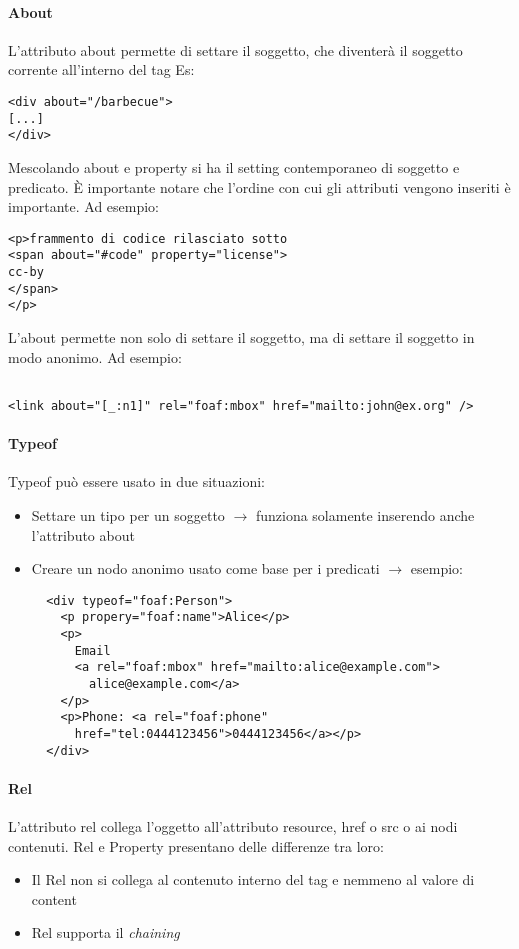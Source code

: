\paragraph*{About}L'attributo about permette di settare il soggetto, che diventer\`a il soggetto corrente all'interno del tag
Es:
\begin{verbatim}
<div about="/barbecue">
[...]
</div>
\end{verbatim}

Mescolando about e property si ha il setting contemporaneo di soggetto e predicato. \`E importante notare che l'ordine con cui gli attributi vengono inseriti \`e importante. Ad esempio:
\begin{verbatim}
<p>frammento di codice rilasciato sotto
<span about="#code" property="license">
cc-by
</span>
</p>
\end{verbatim}

L'about permette non solo di settare il soggetto, ma di settare il soggetto in modo anonimo. Ad esempio:
\begin{verbatim}

<link about="[_:n1]" rel="foaf:mbox" href="mailto:john@ex.org" />
\end{verbatim}

\paragraph*{Typeof}
Typeof pu\`o essere usato in due situazioni:
\begin{itemize}
  
\item Settare un tipo per un soggetto $\to$ funziona solamente inserendo anche l'attributo about
\item Creare un nodo anonimo usato come base per i predicati $\to$ esempio:
\begin{verbatim}
  <div typeof="foaf:Person">
    <p propery="foaf:name">Alice</p>
    <p>
      Email
      <a rel="foaf:mbox" href="mailto:alice@example.com">
        alice@example.com</a>
    </p>
    <p>Phone: <a rel="foaf:phone"
      href="tel:0444123456">0444123456</a></p>
  </div>

\end{verbatim}

\end{itemize}

\paragraph*{Rel}L'attributo rel collega l'oggetto all'attributo resource, href o src o ai nodi contenuti. Rel e Property presentano delle differenze tra loro:
\begin{itemize}

\item Il Rel non si collega al contenuto interno del tag e nemmeno al valore di content
\item Rel supporta il \textit{chaining}
  
\end{itemize}

